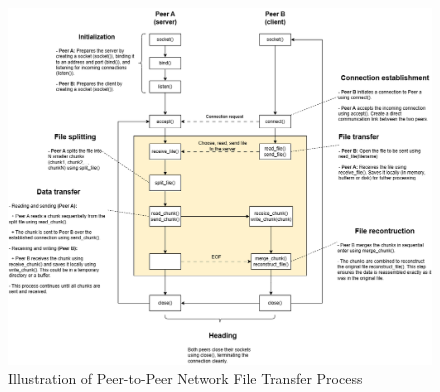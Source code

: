 \begin{figure}[H]
    \centering
    \includegraphics[width=\textwidth]{A-P2P-file-sharing-application-system.png}
    \caption{Illustration of Peer-to-Peer Network File Transfer Process}
    \label{fig:p2p-transfer}
\end{figure}
